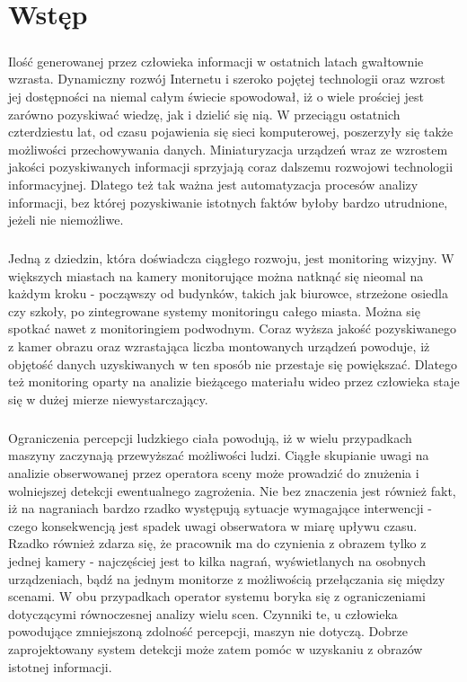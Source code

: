 \chapter{Wstęp}
\label{cha:wstęp}

\paragraph{}
Ilość generowanej przez człowieka informacji w ostatnich latach gwałtownie wzrasta. Dynamiczny rozwój  Internetu i szeroko pojętej technologii  oraz wzrost jej dostępności na niemal całym świecie spowodował, iż o wiele prościej jest zarówno pozyskiwać wiedzę, jak i dzielić się nią. W przeciągu ostatnich czterdziestu lat, od czasu pojawienia się sieci komputerowej, poszerzyły się także możliwości przechowywania danych. Miniaturyzacja urządzeń wraz ze wzrostem jakości pozyskiwanych informacji sprzyjają coraz dalszemu rozwojowi technologii informacyjnej. Dlatego też tak ważna jest automatyzacja procesów analizy informacji, bez której pozyskiwanie istotnych faktów byłoby bardzo utrudnione, jeżeli nie niemożliwe. 
\paragraph{}
Jedną z dziedzin, która doświadcza ciągłego rozwoju, jest monitoring wizyjny. W większych miastach na kamery monitorujące można natknąć się nieomal na każdym kroku - począwszy od budynków, takich jak biurowce, strzeżone osiedla czy szkoły, po zintegrowane systemy monitoringu całego miasta. Można się spotkać nawet z monitoringiem podwodnym. Coraz wyższa jakość pozyskiwanego z kamer obrazu oraz wzrastająca liczba montowanych urządzeń powoduje, iż objętość danych uzyskiwanych w ten sposób nie przestaje się powiększać. Dlatego też monitoring oparty na analizie bieżącego materiału wideo przez człowieka staje się w dużej mierze niewystarczający.
\paragraph{}
Ograniczenia percepcji ludzkiego ciała powodują, iż w wielu przypadkach maszyny zaczynają przewyższać możliwości ludzi. Ciągłe skupianie uwagi na analizie obserwowanej przez operatora sceny może prowadzić do znużenia i wolniejszej detekcji ewentualnego zagrożenia. Nie bez znaczenia jest również fakt, iż na nagraniach bardzo rzadko występują sytuacje wymagające interwencji - czego konsekwencją jest spadek uwagi obserwatora w miarę upływu czasu. Rzadko również zdarza się, że pracownik ma do czynienia z obrazem tylko z jednej kamery - najczęściej jest to kilka nagrań, wyświetlanych na osobnych urządzeniach, bądź na jednym monitorze z możliwością przełączania się między scenami. W obu przypadkach operator systemu boryka się z ograniczeniami dotyczącymi równoczesnej analizy wielu scen. Czynniki te, u człowieka powodujące zmniejszoną zdolność percepcji, maszyn nie dotyczą. Dobrze zaprojektowany system detekcji może zatem pomóc w uzyskaniu z obrazów istotnej informacji.
